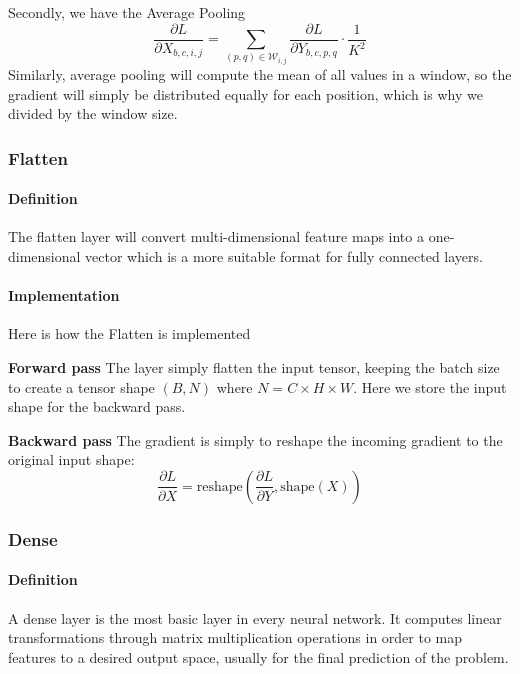 \documentclass[conference]{IEEEtran}
\begin{document}
Secondly, we have the Average Pooling 
\begin{equation}
\frac{\partial L}{\partial X_{b,c,i,j}} = \sum_{(p,q) \in \mathcal{W}_{i,j}} \frac{\partial L}{\partial Y_{b,c,p,q}} \cdot \frac{1}{K^2}
\end{equation}
Similarly, average pooling will compute the mean of all values in a window, so the gradient will simply be distributed equally for each position, which is why we divided by the window size.

\subsubsection{Flatten}
\paragraph{Definition} The flatten layer will convert multi-dimensional feature maps into a one-dimensional vector which is a more suitable format for fully connected layers.

\paragraph{Implementation} Here is how the Flatten is implemented

\textbf{Forward pass} The layer simply flatten the input tensor, keeping the batch size to create a tensor shape $(B, N)$ where $N = C \times H \times W$. Here we store the input shape for the backward pass.

\textbf{Backward pass} The gradient is simply to reshape the incoming gradient to the original input shape:
\begin{equation}
\frac{\partial L}{\partial X} = \text{reshape}\left(\frac{\partial L}{\partial Y}, \text{shape}(X)\right)
\end{equation}

\subsubsection{Dense}

\paragraph{Definition} A dense layer is the most basic layer in every neural network. It computes linear transformations through matrix multiplication operations in order to map features to a desired output space, usually for the final prediction of the problem.
\end{document}
